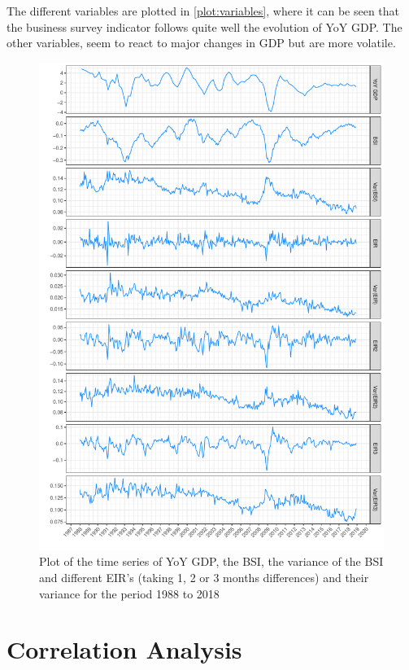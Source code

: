 \documentclass[12pt,a4paper,oneside]{book}
\begin{document}
The different variables are plotted in \autoref{plot:variables}, where it can be seen that the business survey indicator follows quite well the evolution of YoY GDP. 
The other variables, seem to react to major changes in GDP but are more volatile.

\begin{figure}[!htbp]
    \centering
    \includegraphics[scale=0.75]{Graphs/variables.pdf}
    \caption{Plot of the time series of YoY GDP, the BSI, the variance of the BSI and different EIR's (taking 1, 2 or 3 months differences) and their variance
    for the period 1988 to 2018}
    \label{plot:variables}
\end{figure}



\section{Correlation Analysis}
\end{document}
